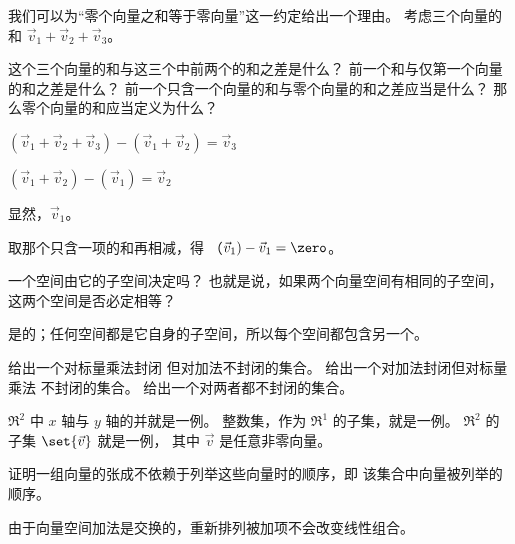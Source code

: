   \item 
    我们可以为“零个向量之和等于零向量”这一约定给出一个理由。
    考虑三个向量的和 $\vec{v}_1+\vec{v}_2+\vec{v}_3$。
    \begin{exparts}
      \partsitem 这个三个向量的和与这三个中前两个的和之差是什么？
      \partsitem 前一个和与仅第一个向量的和之差是什么？
      \partsitem 前一个只含一个向量的和与零个向量的和之差应当是什么？
      \partsitem 那么零个向量的和应当定义为什么？
    \end{exparts}
    \begin{answer}
      \begin{exparts}
        \item $(\vec{v}_1+\vec{v}_2+\vec{v}_3)-(\vec{v}_1+\vec{v}_2)
                 =\vec{v}_3$
        \item $(\vec{v}_1+\vec{v}_2)-(\vec{v}_1)
                 =\vec{v}_2$
        \item 显然，$\vec{v}_1$。
        \item 取那个只含一项的和再相减，得
          （$\vec{v}_1)-\vec{v}_1=\zero$。
      \end{exparts}
    \end{answer}
  \item 
    一个空间由它的子空间决定吗？
    也就是说，如果两个向量空间有相同的子空间，这两个空间是否必定相等？
    \begin{answer}
      是的；任何空间都是它自身的子空间，所以每个空间都包含另一个。  
    \end{answer}
  \item 
     \begin{exparts}
      \partsitem 给出一个对标量乘法封闭
        但对加法不封闭的集合。
      \partsitem 给出一个对加法封闭但对标量乘法
        不封闭的集合。
      \partsitem 给出一个对两者都不封闭的集合。
    \end{exparts}
    \begin{answer}
      \begin{exparts}
        \partsitem \( \Re^2 \) 中 \( x \) 轴与 \( y \) 轴的并就是一例。
        \partsitem 整数集，作为 \( \Re^1 \) 的子集，就是一例。
        \partsitem \( \Re^2 \) 的子集 \( \set{\vec{v}} \) 就是一例，
          其中 $\vec{v}$ 是任意非零向量。
      \end{exparts}  
     \end{answer}
  \item 
    证明一组向量的张成不依赖于列举这些向量时的顺序，即
    该集合中向量被列举的顺序。
    \begin{answer}
      由于向量空间加法是交换的，重新排列被加项不会改变线性组合。  
    \end{answer}
